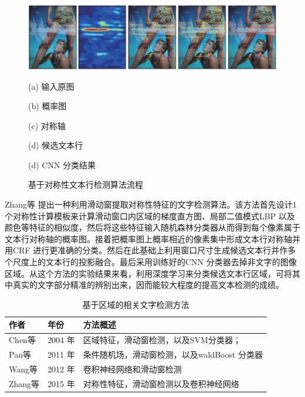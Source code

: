     \begin{figure}[!h]
    \centering
    \includegraphics[width=\textwidth]{./figures/c2_zhang_cnn.jpg}
    \begin{minipage}[t]{0.18\linewidth}
    \centerline{ \small (a) 输入原图}
    \end{minipage}
    \begin{minipage}[t]{0.18\linewidth}
    \centerline{ \small (b) 概率图}
    \end{minipage}
    \begin{minipage}[t]{0.18\linewidth}
    \centerline{ \small (c) 对称轴}
    \end{minipage}
    \begin{minipage}[t]{0.18\linewidth}
    \centerline{ \small (d) 候选文本行}
    \end{minipage}
    \begin{minipage}[t]{0.18\linewidth}
    \centerline{ \small (d) CNN 分类结果}
    \end{minipage}
    \caption{基于对称性文本行检测算法流程}
    \label{fig.c2_zhang_cnn}
    \end{figure}

    Zhang等\cite{Zhang2015Symmetry} 提出一种利用滑动窗提取对称性特征的文字检测算法。该方法首先设计1 个对称性计算模板来计算滑动窗口内区域的梯度直方图、局部二值模式LBP 以及颜色等特征的相似度，然后将这些特征输入随机森林分类器从而得到每个像素属于文本行对称轴的概率图。接着把概率图上概率相近的像素集中形成文本行对称轴并用CRF 进行更准确的分类。然后在此基础上利用窗口尺寸生成候选文本行并作多个尺度上的文本行的投影融合。最后采用训练好的CNN 分类器去掉非文字的图像区域。从这个方法的实验结果来看，利用深度学习来分类候选文本行区域，可将其中真实的文字部分精准的辨别出来，因而能较大程度的提高文本检测的成绩。

    \begin{table}[!h]
    \small
    \centering
    \caption{基于区域的相关文字检测方法}
    \begin{tabular}{p{} p{} p{}}
    \toprule
    作者 & 年份 & 方法概述 \\
    \midrule
    Chen等\cite{Chen2004Detecting} & 2004 年 & 区域特征，滑动窗检测，以及SVM分类器；\\
    Pan等\cite{Pan2011A} & 2011 年 &   条件随机场，滑动窗检测，以及waldBoost 分类器\\
    Wang等\cite{Wang2012End} & 2012 年 & 卷积神经网络和滑动窗检测 \\
    Zhang等\cite{Zhang2015Symmetry} & 2015 年 & 对称性特征，滑动窗检测以及卷积神经网络 \\
    \bottomrule
    \end{tabular}
    \label{tab.c2_region_based}
    \end{table}

